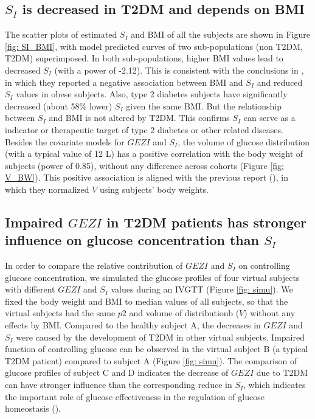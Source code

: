 \documentclass[utf8]{frontiersSCNS} %
\begin{document}
\subsection{$S_I$ is decreased in T2DM and depends on BMI}
The scatter plots of estimated $S_I$ and BMI of all the subjects are shown in Figure \ref{fig: SI_BMI}, with model predicted curves of two sub-populations (non T2DM, T2DM) superimposed. In both sub-populations, higher BMI values lead to decreased $S_I$ (with a power of -2.12). This is consistent with the conclusions in %
, in which they reported a negative association between BMI and $S_I$ and reduced $S_I$ values in obese subjects. Also, type 2 diabetes subjects have significantly decreased (about 58\% lower) $S_I$ given the same BMI. But the relationship between $S_I$ and BMI is not altered by T2DM. This confirms $S_I$ can serve as a indicator or therapeutic target of type 2 diabetes or other related diseases. Besides the covariate models for $GEZI$ and $S_I$, the volume of glucose distribution (with a typical value of 12 L) has a positive correlation with the body weight of subjects (power of 0.85), without any difference across cohorts (Figure \ref{fig: V_BW}). This positive association is aligned with the previous report (\cite{Denti2010}), in which they normalized $V$ using subjects' body weights. \\
\subsection{Impaired $GEZI$ in T2DM patients has stronger influence on glucose concentration than $S_I$}
In order to compare the relative contribution of $GEZI$ and $S_I$ on controlling glucose concentration, we simulated the glucose profiles of four virtual subjects with different $GEZI$ and $S_I$ values during an IVGTT (Figure \ref{fig: simu}). We fixed the body weight and BMI to median values of all subjects, so that the virtual subjects had the same $p2$ and volume of distributionb ($V$) without any effects by BMI. Compared to the healthy subject A, the decreases in $GEZI$ and $S_I$ were caused by the development of T2DM in other virtual subjects. Impaired function of controlling glucose can be observed in the virtual subject B (a typical T2DM patient) compared to subject A (Figure \ref{fig: simu}). The comparison of glucose profiles of subject C and D indicates the decrease of $GEZI$ due to T2DM can have stronger influence than the corresponding reduce in $S_I$, which indicates the important role of glucose effectiveness in the regulation of glucose homeostasis (\cite{Dube2015}). 
\end{document}
